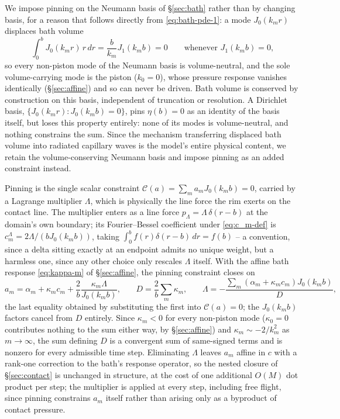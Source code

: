 We impose pinning on the Neumann basis of \S\ref{sec:bath} rather than by changing basis, for a reason that follows directly from \eqref{eq:bath-pde-1}: a mode $J_0(k_mr)$ displaces bath volume
\begin{equation}
    \int_0^bJ_0(k_mr)\,r\,dr = \frac{b}{k_m}J_1(k_mb) = 0\qquad\text{whenever }J_1(k_mb)=0\text{,}
    \label{eq:volume-neutral}
\end{equation}
so every non-piston mode of the Neumann basis is volume-neutral, and the sole volume-carrying mode is the piston ($k_0=0$), whose pressure response vanishes identically (\S\ref{sec:affine}) and so can never be driven. Bath volume is conserved by construction on this basis, independent of truncation or resolution. A Dirichlet basis, $\{J_0(k_mr):J_0(k_mb)=0\}$, pins $\eta(b)=0$ as an identity of the basis itself, but loses this property entirely: none of its modes is volume-neutral, and nothing constrains the sum. Since the mechanism transferring displaced bath volume into radiated capillary waves is the model's entire physical content, we retain the volume-conserving Neumann basis and impose pinning as an added constraint instead.

Pinning is the single scalar constraint $\mathcal C(a)=\sum_ma_mJ_0(k_mb)=0$, carried by a Lagrange multiplier $\Lambda$, which is physically the line force the rim exerts on the contact line. The multiplier enters as a line force $p_\Lambda=\Lambda\,\delta(r-b)$ at the domain's own boundary; its Fourier--Bessel coefficient under \eqref{eq:c_m-def} is $c_m^\Lambda=2\Lambda/(bJ_0(k_mb))$, taking $\int_0^bf(r)\delta(r-b)\,dr=f(b)$ -- a convention, since a delta sitting exactly at an endpoint admits no unique weight, but a harmless one, since any other choice only rescales $\Lambda$ itself. With the affine bath response \eqref{eq:kappa-m} of \S\ref{sec:affine}, the pinning constraint closes on
\begin{equation}
    a_m = \alpha_m + \kappa_mc_m + \frac{2}{b}\frac{\kappa_m\Lambda}{J_0(k_mb)}\text{,}\qquad
    D = \frac{2}{b}\sum_m\kappa_m\text{,}\qquad
    \Lambda = -\frac{\sum_m(\alpha_m+\kappa_mc_m)J_0(k_mb)}{D}\text{,}
    \label{eq:route-b-multiplier}
\end{equation}
the last equality obtained by substituting the first into $\mathcal C(a)=0$; the $J_0(k_mb)$ factors cancel from $D$ entirely. Since $\kappa_m<0$ for every non-piston mode ($\kappa_0=0$ contributes nothing to the sum either way, by \S\ref{sec:affine}) and $\kappa_m\sim-2/k_m^2$ as $m\to\infty$, the sum defining $D$ is a convergent sum of same-signed terms and is nonzero for every admissible time step. Eliminating $\Lambda$ leaves $a_m$ affine in $c$ with a rank-one correction to the bath's response operator, so the nested closure of \S\ref{sec:contact} is unchanged in structure, at the cost of one additional $O(M)$ dot product per step; the multiplier is applied at every step, including free flight, since pinning constrains $a_m$ itself rather than arising only as a byproduct of contact pressure.

